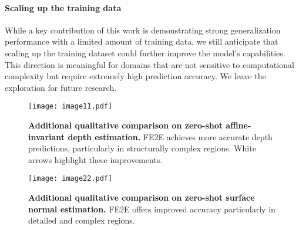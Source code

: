 \documentclass{article} %
\begin{document}
\paragraph{Scaling up the training data}
While a key contribution of this work is demonstrating strong generalization performance with a limited amount of training data, we still anticipate that scaling up the training dataset could further improve the model's capabilities. This direction is meaningful for domains that are not sensitive to computational complexity but require extremely high prediction accuracy. We leave the exploration for future research.
\begin{figure}[!t]
  \centering
  \texttt{[image: image11.pdf]}
  \caption{\textbf{Additional qualitative comparison on zero-shot affine-invariant depth estimation.} FE2E achieves more accurate depth predictions, particularly in structurally complex regions. White arrows highlight these improvements.}
  \label{fig:append1}
  \vspace*{-1em}
\end{figure}
\begin{figure}[!t]  
  \centering
  \texttt{[image: image22.pdf]}
  \caption{\textbf{Additional qualitative comparison on zero-shot surface normal estimation.} FE2E offers improved accuracy particularly in detailed and complex regions. }
  \label{fig:append2}
  \vspace*{-1em}
\end{figure}

\newpage
\end{document}
